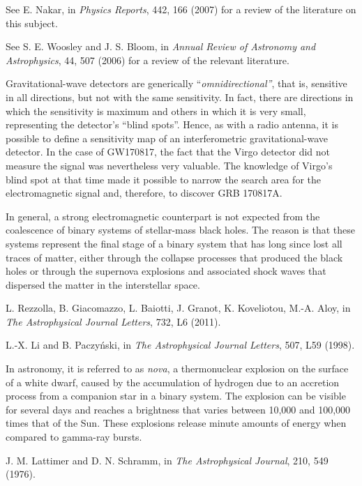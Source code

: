 \begin{description}[style=multiline,leftmargin=2em,labelwidth=1.5em]
\item[9.]\hypertarget{note:08-09}{}See E. Nakar, in \emph{Physics Reports}, 442, 166 (2007) for a review of the literature
on this subject.

\item[10.]\hypertarget{note:08-10}{}See S. E. Woosley and J. S. Bloom, in \emph{Annual Review of Astronomy and
Astrophysics}, 44, 507 (2006) for a review of the relevant literature.

\item[11.]\hypertarget{note:08-11}{}Gravitational-wave detectors are generically ``\emph{omnidirectional''}, that is,
sensitive in all directions, but not with the same sensitivity. In fact, there are
directions in which the sensitivity is maximum and others in which it is very small,
representing the detector's ``blind spots''. Hence, as with a radio antenna, it is
possible to define a sensitivity map of an interferometric gravitational-wave detector.
In the case of GW170817, the fact that the Virgo detector did not
measure the signal was nevertheless very valuable. The knowledge of Virgo's blind spot
at that time made it possible to narrow the search area for the electromagnetic signal
and, therefore, to discover GRB 170817A.

\item[12.]\hypertarget{note:08-12}{}In general, a strong electromagnetic counterpart is not expected from
the coalescence of binary systems of stellar-mass black holes. The reason is that these
systems represent the final stage of a binary system that has long since lost all traces
of matter, either through the collapse processes that produced the black holes or
through the supernova explosions and associated shock waves that
dispersed the matter in the interstellar space.

\item[13.]\hypertarget{note:08-13}{}L. Rezzolla, B. Giacomazzo, L. Baiotti, J. Granot, K. Koveliotou, M.-A. Aloy, in
\emph{The Astrophysical Journal Letters}, 732, L6 (2011).

\item[14.]\hypertarget{note:08-14}{}L.-X. Li and B. Paczyński, in \emph{The Astrophysical Journal Letters}, 507, L59 (1998).

\item[15.]\hypertarget{note:08-15}{}In astronomy, it is referred to as \emph{nova}, a thermonuclear
explosion on the surface of a white dwarf, caused by the accumulation of hydrogen due to
an accretion process from a companion star in a binary system. The explosion can be
visible for several days and reaches a brightness that varies between 10,000 and 100,000
times that of the Sun. These explosions release minute amounts of energy when compared
to gamma-ray bursts.

\item[16.]\hypertarget{note:08-16}{}J. M. Lattimer and D. N. Schramm, in \emph{The Astrophysical Journal}, 210, 549 (1976).

\end{description}
